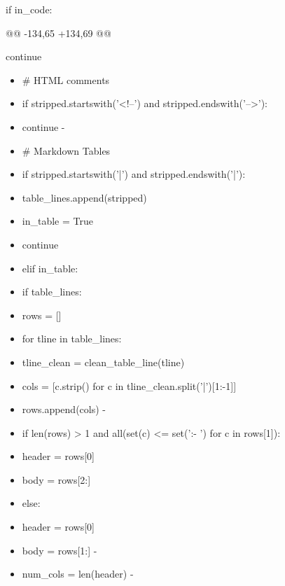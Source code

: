 \documentclass[11pt,a4paper]{article}
\begin{document}
if in\_code:

@@ -134,65 +134,69 @@

continue


\begin{itemize}
\item        \# HTML comments
\item        if stripped.startswith('<!--') and stripped.endswith('-->'):
\item            continue
-

\item        \# Markdown Tables
\item        if stripped.startswith('|') and stripped.endswith('|'):
\item            table\_lines.append(stripped)
\item            in\_table = True
\item            continue
\item        elif in\_table:
\item            if table\_lines:
\item                rows = []
\item                for tline in table\_lines:
\item                    tline\_clean = clean\_table\_line(tline)
\item                    cols = [c.strip() for c in tline\_clean.split('|')[1:-1]]
\item                    rows.append(cols)
-

\item                if len(rows) > 1 and all(set(c) <= set(':- ') for c in rows[1]):
\item                    header = rows[0]
\item                    body = rows[2:]
\item                else:
\item                    header = rows[0]
\item                    body = rows[1:]
-

\item                num\_cols = len(header)
-


\end{itemize}
\end{document}
